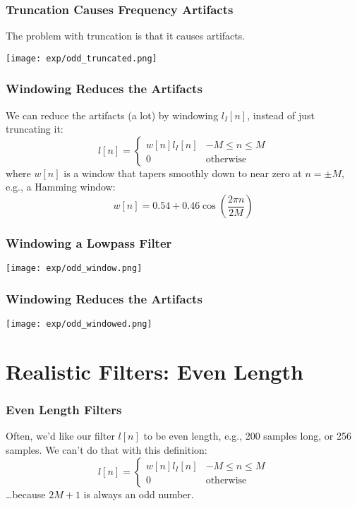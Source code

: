 \documentclass{beamer}
\begin{document}
\begin{frame}
  \frametitle{Truncation Causes Frequency Artifacts}

  The problem with truncation is that it causes artifacts.

  \centerline{\texttt{[image: exp/odd\_truncated.png]}}
\end{frame}


\begin{frame}
  \frametitle{Windowing Reduces the Artifacts}

  We can reduce the artifacts (a lot) by
  windowing $l_I[n]$, instead of just truncating it:
  \[
  l[n] = \begin{cases}
    w[n]l_I[n] & -M\le n\le M\\
    0 &\mbox{otherwise}
  \end{cases}
  \]
  where $w[n]$ is a window that tapers smoothly down to near zero at
  $n=\pm M$, e.g., a Hamming window:
  \[
  w[n] = 0.54 + 0.46 \cos\left(\frac{2\pi n}{2M}\right)
  \]
\end{frame}

\begin{frame}
  \frametitle{Windowing a Lowpass Filter}
  \centerline{\texttt{[image: exp/odd\_window.png]}}
\end{frame}

\begin{frame}
  \frametitle{Windowing Reduces the Artifacts}

  \centerline{\texttt{[image: exp/odd\_windowed.png]}}
\end{frame}


\section[Even Length]{Realistic Filters: Even Length}
\setcounter{subsection}{1}

\begin{frame}
  \frametitle{Even Length Filters}

  Often, we'd like our filter $l[n]$ to be even length, e.g., 200
  samples long, or 256 samples.  We can't do that with this definition:
  \[
  l[n] = \begin{cases}
    w[n]l_I[n] & -M\le n\le M\\
    0 &\mbox{otherwise}
  \end{cases}
  \]
  \ldots because $2M+1$ is always an odd number.
\end{frame}
\end{document}
